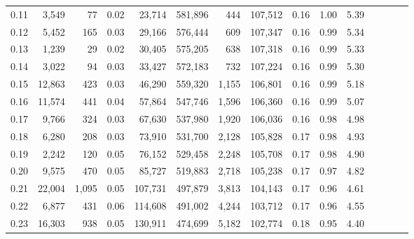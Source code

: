 \begin{tabular}{rrrcrrrrrrrrrrr}
0.11 &   3,549 &     77 &                                       0.02 &   23,714 &  581,896 &      444 &  107,512 &  0.16 &  1.00 &                         5.39 \\
0.12 &   5,452 &    165 &                                       0.03 &   29,166 &  576,444 &      609 &  107,347 &  0.16 &  0.99 &                         5.34 \\
0.13 &   1,239 &     29 &                                       0.02 &   30,405 &  575,205 &      638 &  107,318 &  0.16 &  0.99 &                         5.33 \\
0.14 &   3,022 &     94 &                                       0.03 &   33,427 &  572,183 &      732 &  107,224 &  0.16 &  0.99 &                         5.30 \\
0.15 &  12,863 &    423 &                                       0.03 &   46,290 &  559,320 &    1,155 &  106,801 &  0.16 &  0.99 &                         5.18 \\
0.16 &  11,574 &    441 &                                       0.04 &   57,864 &  547,746 &    1,596 &  106,360 &  0.16 &  0.99 &                         5.07 \\
0.17 &   9,766 &    324 &                                       0.03 &   67,630 &  537,980 &    1,920 &  106,036 &  0.16 &  0.98 &                         4.98 \\
0.18 &   6,280 &    208 &                                       0.03 &   73,910 &  531,700 &    2,128 &  105,828 &  0.17 &  0.98 &                         4.93 \\
0.19 &   2,242 &    120 &                                       0.05 &   76,152 &  529,458 &    2,248 &  105,708 &  0.17 &  0.98 &                         4.90 \\
0.20 &   9,575 &    470 &                                       0.05 &   85,727 &  519,883 &    2,718 &  105,238 &  0.17 &  0.97 &                         4.82 \\
0.21 &  22,004 &  1,095 &                                       0.05 &  107,731 &  497,879 &    3,813 &  104,143 &  0.17 &  0.96 &                         4.61 \\
0.22 &   6,877 &    431 &                                       0.06 &  114,608 &  491,002 &    4,244 &  103,712 &  0.17 &  0.96 &                         4.55 \\
0.23 &  16,303 &    938 &                                       0.05 &  130,911 &  474,699 &    5,182 &  102,774 &  0.18 &  0.95 &                         4.40 \\

\end{tabular}
